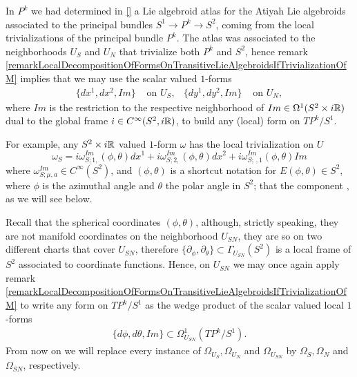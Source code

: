 \begin{example}[$P^k$]
In $P^k$ we had determined in \ref{} a Lie algebroid atlas for the Atiyah Lie algebroids associated to the principal bundles $S^1 \to P^k \to S^2$, coming from the local trivializations of the principal bundle $P^k$. The atlas was associated to the neighborhoods $U_S$ and $U_N$ that trivialize both $P^k$ and $S^2$, hence remark \ref{remarkLocalDecompositionOfFormsOnTransitiveLieAlgebroidsIfTrivializationOfM} implies that we may use the scalar valued $1$-forms
\begin{align}
    \{dx^1, dx^2, Im\} &\text{ on } U_S, & \{dy^1, dy^2, Im\} &\text{ on } U_N,
\end{align}
where $Im$ is the restriction to the respective neighborhood of $Im \in \Omega^1(S^2 \times i\mathbb{R})$ dual to the global frame $i \in C^\infty(S^2, i\mathbb{R})$, to build any (local) form on $TP^k/S^1$.

For example, any $S^2 \times i\mathbb{R}$ valued $1$-form $\omega$ has the local trivialization on $U$
\begin{equation}
    \omega_S = i\omega^{Im}_{S; 1,}(\phi, \theta) dx^1 + i\omega^{Im}_{S; 2,}(\phi, \theta) dx^2 + i\omega^{Im}_{S; \, ,1}(\phi, \theta) Im
\end{equation}
where $\omega^{Im}_{S;\mu,  a} \in C^\infty(S^2)$, and $(\phi, \theta)$ is a shortcut notation for $E(\phi, \theta) \in S^2$, where $\phi$ is the azimuthal angle and $\theta$ the polar angle in $S^2$; that the component , as we will see below.

Recall that the spherical coordinates $(\phi, \theta)$, although, strictly speaking, they are not manifold coordinates on the neighborhood $U_{SN}$, they are so on two different charts that cover $U_{SN}$, therefore $\{\partial_\phi, \partial_\theta\} \subset \Gamma_{U_{SN}}(S^2)$ is a local frame of $S^2$ associated to coordinate functions. Hence, on $U_{SN}$ we may once again apply remark \ref{remarkLocalDecompositionOfFormsOnTransitiveLieAlgebroidsIfTrivializationOfM} to write any form on $TP^k/S^1$ as the wedge product of the scalar valued local $1$-forms
\begin{align}
    \{d\phi, d\theta, Im\} \subset \Omega^1_{U_{SN}}(TP^k/S^1).
\end{align} From now on we will replace every instance of $\Omega_{U_{S}}, \Omega_{U_{N}}$ and $\Omega_{U_{SN}}$ by $\Omega_{S}, \Omega_{N}$ and $\Omega_{SN}$, respectively.
\end{example}

